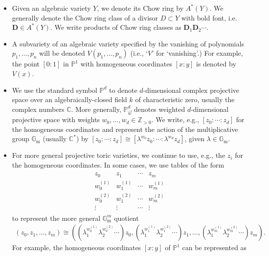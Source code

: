 \documentclass[11pt,oneside,english]{article}
\numberwithin{equation}{section}
\theoremstyle{definition}
\begin{document}
\begin{itemize}
\item Given an algebraic variety $Y$, we denote its Chow ring by $A^*(Y)$. We generally denote the Chow ring class of a divisor $D \subset Y$ with bold font, i.e. $\boldsymbol D \in A^*(Y)$. We write products of Chow ring classes as $\boldsymbol D_1 \boldsymbol D_2 \cdots$. 
\item A subvariety of an algebraic variety specified by the vanishing of polynomials $p_1, \dots , p_n$ will be denoted $V(p_1,\dots, p_n)$ (i.e., `$V$' for `vanishing'.) For example, the point $[0:1]$ in $\mathbb P^1$ with homogeneous coordinates $[x:y]$ is denoted by $V(x)$.
\item We use the standard symbol $\mathbb P^d$ to denote $d$-dimensional complex projective space over an algebraically-closed field $k$ of characteristic zero, usually the complex numbers $\mathbb C$. More generally, $\mathbb P^d_{\vec w}$ denotes weighted $d$-dimensional projective space with weights $w_0,\dots, w_d \in \mathbb Z_{>0}$. We write, e.g., $[z_0:\cdots: z_d]$ for the homogeneous coordinates and represent the action of the multiplicative group $\mathbb{G}_{\text{m}}$ (usually $\mathbb C^*$) by $[z_0:\cdots :z_d] \cong [\lambda^{w_0 } z_0 :\cdots:\lambda^{w_d} z_d]$, given $\lambda \in \mathbb{G}_{\text{m}}$.  
\item For more general projective toric varieties, we continue to use, e.g., the $z_i$ for the homogeneous coordinates. In some cases, we use tables of the form 
	\begin{align}
		\begin{array}{cccc}
			 z_0 & z_1 & \cdots & z_m\\\hline
			 w_{0}^{(1)} & w_1^{(1)}& \cdots & w_m^{(1)} \\
			w_{0}^{(2)} & w_1^{(2)}& \cdots & w_m^{(2)}\\
			\vdots&\vdots&\cdots &\vdots
		\end{array}
	\end{align}
to represent the more general $\mathbb{G}_{\text{m}}^m$ quotient 
	\begin{align}
	(z_0, z_1 , \dots, z_m) \cong ((\lambda_1^{w_0^{(1)}} \lambda_2^{w_0^{(2)}}  \cdots )z_0,(\lambda_1^{w_1^{(1)}} \lambda_2^{w_1^{(2)}}\cdots) z_1,\dots, (\lambda_1^{w_m^{(1)}} \lambda_2^{w_m^{(2)}} \cdots) z_m). 
\end{align}
For example, the homogeneous coordinates $[x:y]$ of $\mathbb P^1$ can be represented as 
	\begin{align}

\end{align}
\end{itemize}
\end{document}
